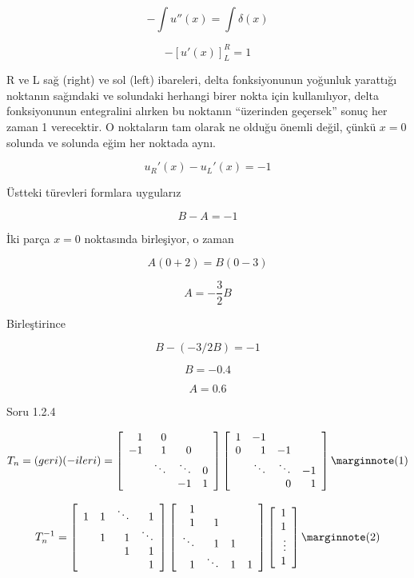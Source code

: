 \documentclass[12pt,fleqn]{article}\usepackage{../../common}
\begin{document}
$$ -\int u''(x) = \int \delta(x) $$

$$ -[u'(x)]_L^R = 1 $$

R ve L sağ (right) ve sol (left) ibareleri, delta fonksiyonunun yoğunluk
yarattığı noktanın sağındaki ve solundaki herhangi birer nokta için
kullanılıyor, delta fonksiyonunun entegralini alırken bu noktanın
``üzerinden geçersek'' sonuç her zaman 1 verecektir. O noktaların tam
olarak ne olduğu önemli değil, çünkü $x=0$ solunda ve solunda eğim her
noktada aynı.

$$ u_R'(x) - u_L'(x) = -1 $$

Üstteki türevleri formlara uygularız

$$ B - A = -1 $$

İki parça $x=0$ noktasında birleşiyor, o zaman

$$ A(0+2) = B(0-3) $$

$$ A = -\frac{3}{2}B $$

Birleştirince

$$ B - (-3/2 B ) = -1 $$

$$ B = -0.4 $$

$$ A = 0.6 $$

Soru 1.2.4

$$
T_n = (geri)(-ileri) =
\left[\begin{array}{rrrr}
1  &   0        &    &   \\
-1 &   1        & 0  &   \\
   & \ddots & \ddots & 0 \\
   &        &    -1  & 1 
\end{array}\right]
\left[\begin{array}{rrrr}
1  &  -1        &    &   \\
0  &   1        & -1 &   \\
   & \ddots & \ddots & -1 \\
   &        &    0  & 1 
\end{array}\right]
\mlabel{1}
$$

$$
T_n^{-1} =
\left[\begin{array}{rrrr}
1  &  1     & \ddots   & 1       \\
   &  1     &  1       & \ddots  \\
   &        & 1        & 1       \\
   &        &          & 1 
\end{array}\right]
\left[\begin{array}{rrrr}
1        &        &         &   \\
1        &  1     &         &   \\
\ddots   &  1     & 1       &   \\
1        &  \ddots & 1       & 1 
\end{array}\right]
\left[\begin{array}{r}
1 \\ 1 \\ \vdots \\ 1
\end{array}\right]
\mlabel{2}
$$
\end{document}
